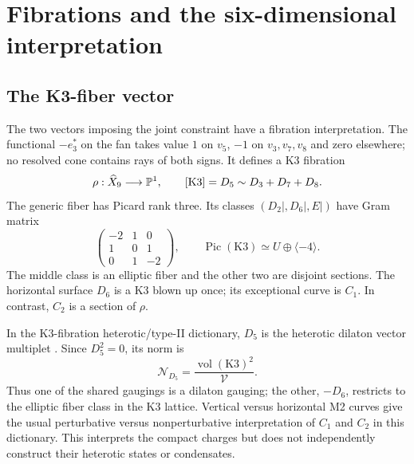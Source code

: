 \section{Fibrations and the six-dimensional interpretation}
\label{sec:fibrations}

\subsection{The K3-fiber vector}
\label{subsec:k3-fibration}

The two vectors imposing the joint constraint have a fibration
interpretation. The functional $-e_3^*$ on the fan takes value
$1$ on $v_5$, $-1$ on $v_3,v_7,v_8$ and zero elsewhere;
no resolved cone contains rays of both signs. It defines a K3
fibration
\begin{equation}
 \rho:\widehat X_9\longrightarrow\mathbb P^1,\qquad
 [\mathrm{K3}]=D_5\sim D_3+D_7+D_8.
 \label{eq:k3-fibration}
\end{equation}
The generic fiber has Picard rank three. Its classes
$(D_2|,D_6|,E|)$ have Gram matrix
\begin{equation}
 \begin{pmatrix}-2&1&0\\1&0&1\\0&1&-2\end{pmatrix},\qquad
 \operatorname{Pic}(\mathrm{K3})\simeq U\oplus\langle-4\rangle.
 \label{eq:k3-lattice}
\end{equation}
The middle class is an elliptic fiber and the other two are
disjoint sections. The horizontal surface $D_6$ is a K3 blown
up once; its exceptional curve is $C_1$. In contrast, $C_2$
is a section of $\rho$.

In the K3-fibration heterotic/type-II dictionary, $D_5$ is the
heterotic dilaton vector multiplet
\cite{Kachru:1995wm,Klemm:1995tj,Aspinwall:1995vk,Antoniadis:1995vz}.
Since $D_5^2=0$, its norm is
\begin{equation}
 \mathcal N_{D_5}=\frac{\operatorname{vol}(\mathrm{K3})^2}{\mathcal V}.
 \label{eq:dilaton-norm}
\end{equation}
Thus one of the shared gaugings is a dilaton gauging; the other,
$-D_6$, restricts to the elliptic fiber class in the K3 lattice.
Vertical versus horizontal M2 curves give the usual perturbative
versus nonperturbative interpretation of $C_1$ and $C_2$ in this
dictionary. This interprets the compact charges but does not
independently construct their heterotic states or condensates.

